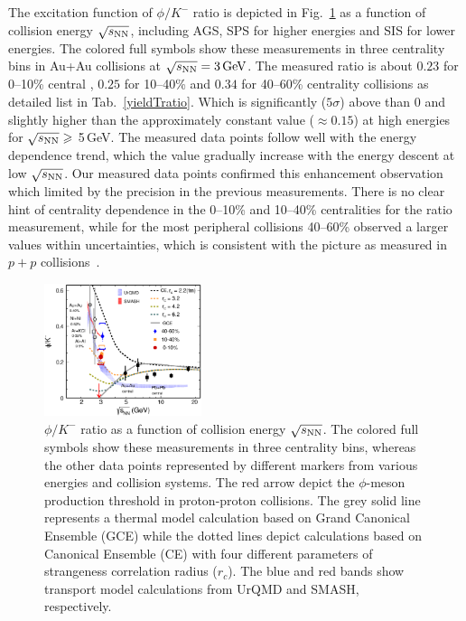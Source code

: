 \documentclass[%
 reprint,	
showpacs,
 amsmath,amssymb,
 aps,
 prc,
]{revtex4-1}
\begin{document}
The excitation function of $\phi/K^-$ ratio is depicted in Fig.~\ref{fig:phi2Kratio} as a function of collision energy $\sqrt{s_{\rm NN}}$, including AGS, SPS for higher energies and SIS for lower energies. The colored full symbols show these measurements in three centrality bins in Au+Au collisions at ${\sqrt{s_{\rm NN}} = \rm{3\,GeV}}$. The measured ratio is about $0.23$ for 0--10\% central , $0.25$ for 10--40\% and $0.34$ for 40--60\% centrality collisions as detailed list in Tab.~\ref{yieldTratio}.
Which is significantly ($5\sigma$) above than 0 and slightly higher than the approximately constant value ($\approx0.15$) at high energies for $\sqrt{s_{\rm NN}}\geqslant$ 5\,GeV. The measured data points follow well with the energy dependence trend, which the value gradually increase with the energy descent at low $\sqrt{s_{\rm NN}}$. Our measured data points confirmed this enhancement observation which limited by the precision in the previous measurements. There is no clear hint of centrality dependence in the 0--10\% and 10--40\% centralities for the ratio measurement, while for the most peripheral collisions 40--60\% observed a larger values within uncertainties, which is consistent with the picture as measured in $p+p$ collisions~\cite{PhysRevC.77.015204}.


\begin{figure}
\centering
\includegraphics[width=0.41\textwidth]{fig/fig4_phi_over_kminus_zoomin.eps}
  \caption{ $\phi/K^-$ ratio as a function of collision energy $\sqrt{s_{\rm NN}}$. The colored full symbols show these measurements in three centrality bins, whereas the other data points represented by different markers from various energies and collision systems. The red arrow depict the $\phi$-meson production threshold in proton-proton collisions. The grey solid line represents a thermal model calculation based on Grand Canonical Ensemble (GCE) while the dotted lines depict calculations based on Canonical Ensemble (CE) with four different parameters of strangeness correlation radius ($r_c$). The blue and red bands show transport model calculations from UrQMD and SMASH, respectively.}
\label{fig:phi2Kratio} 
\end{figure}
\end{document}
